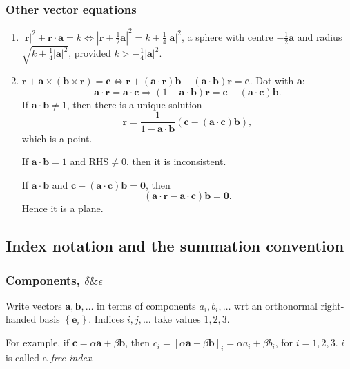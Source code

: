 \documentclass[a4paper]{article}
\begin{document}
\subsubsection{Other vector equations}
\begin{enumerate}[(1)]
  \item $ |\mathbf{r}|^2+\mathbf{r}\cdot \mathbf{a}=k \Leftrightarrow
    \left| \mathbf{r}+\frac{1}{2}\mathbf{a}
    \right|^2=k+\frac{1}{4}|\mathbf{a}|^2  $, a sphere with centre $
    -\frac{1}{2}\mathbf{a} $ and radius $
    \sqrt{k+\frac{1}{4}|\mathbf{a}|^2} $, provided $
    k>-\frac{1}{4}|\mathbf{a}|^2 $.
  \item $ \mathbf{r}+\mathbf{a} \times (\mathbf{b}\times \mathbf{r})
    =\mathbf{c} \Leftrightarrow \mathbf{r}+(\mathbf{a}\cdot
    \mathbf{r})\mathbf{b}-(\mathbf{a}\cdot
    \mathbf{b})\mathbf{r}=\mathbf{c}$. Dot with $\mathbf{a}$:
    \[
      \mathbf{a}\cdot \mathbf{r}= \mathbf{a}\cdot \mathbf{c}
      \Longrightarrow (1-\mathbf{a}\cdot
      \mathbf{b})\mathbf{r}=\mathbf{c}-(\mathbf{a}\cdot \mathbf{c})\mathbf{b}
    .\]
    If $ \mathbf{a}\cdot \mathbf{b}\neq 1 $, then there is a unique solution
    \[
      \mathbf{r} = \frac{1}{1-\mathbf{a}\cdot
      \mathbf{b}}(\mathbf{c}-(\mathbf{a}\cdot \mathbf{c})\mathbf{b})
    ,\]
    which is a point.

    If $ \mathbf{a}\cdot \mathbf{b}=1 $ and RHS$\neq 0$, then it is
    inconsistent.

    If $ \mathbf{a}\cdot \mathbf{b} $ and
    $\mathbf{c}-(\mathbf{a}\cdot \mathbf{c})\mathbf{b}=\mathbf{0}$, then
    \[
      (\mathbf{a}\cdot \mathbf{r}-\mathbf{a}\cdot
      \mathbf{c})\mathbf{b}=\mathbf{0}
    .\]
    Hence it is a plane.
\end{enumerate}
\subsection{Index notation and the summation convention}
\subsubsection{Components, $\delta\& \epsilon$}
Write vectors $ \mathbf{a},\mathbf{b},\dots $ in terms of components
$ a_i,b_i,\dots $ wrt an orthonormal right-handed basis $ \left\{
\mathbf{e}_i\right\} $. Indices $i,j,\dots$ take values $1,2,3$.

For example, if $ \mathbf{c}=\alpha \mathbf{a}+\beta \mathbf{b} $,
then $ c_i=[\alpha \mathbf{a}+\beta \mathbf{b}]_i=\alpha a_i+\beta
b_i $, for $i=1,2,3$. $i$ is called a \textit{free index}.
\end{document}
